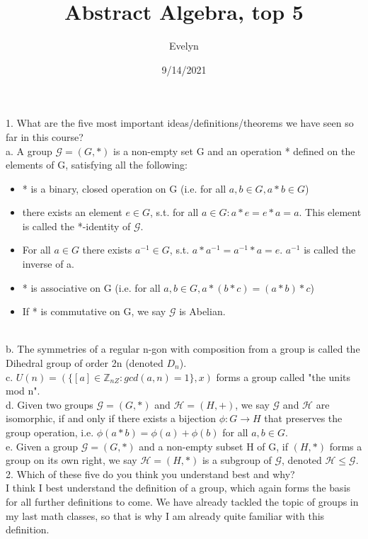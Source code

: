 \documentclass{article}
\title{Abstract Algebra, top 5}
\author{Evelyn}
\date{9/14/2021}
\begin{document}
1. What are the five most important ideas/definitions/theorems we have seen so far in this course?\\

a. A group $\mathcal{G}=(G,*)$ is a non-empty set G and an operation * defined on the elements of G, satisfying all the following:
\begin{itemize}
    \item * is a binary, closed operation on G (i.e. for all $a, b \in G, a*b \in G$)
    \item there exists an element $e \in G$, s.t. for all $a \in G:  a*e=e*a=a$. This element is called the *-identity of $\mathcal{G}$.
    \item For all $a \in G$ there exists $a^{-1} \in G$, s.t.  $a*a^{-1}=a^{-1}*a=e$. $a^{-1}$ is called the inverse of a. 
    \item * is associative on G (i.e. for all $a,b \in G, a*(b*c)=(a*b)*c$)
    \item If * is commutative on G, we say $\mathcal{G}$ is Abelian. 
\end{itemize}\\

b. The symmetries of a regular n-gon with composition from a group is called the Dihedral group of order 2n (denoted $D_n$). \\

c. $U(n)=(\{[a] \in \mathbb{Z}_{n\mathbb{}Z}: gcd(a,n)=1\}, x)$ forms a group called "the units mod n". \\

d. Given two groups $\mathcal{G}=(G,*)$ and $\mathcal{H}=(H,+)$, we say $\mathcal{G}$ and $\mathcal{H}$ are isomorphic, if and only if there exists a bijection $\phi: G \longrightarrow H$ that preserves the group operation, i.e. $\phi(a*b)=\phi(a)+\phi(b)$ for all $a,b \in G$.\\

e. Given a group $\mathcal{G}=(G, *)$ and a non-empty subset H of G, if $(H, *)$ forms a group on its own right, we say $\mathcal{H}=(H, *)$ is a subgroup of $\mathcal{G}$, denoted $\mathcal{H}\leq \mathcal{G}$.\\



2. Which of these five do you think you understand best and why?\\

I think I best understand the definition of a group, which again forms the basis for all further definitions to come. We have already tackled the topic of groups in my last math classes, so that is why I am already quite familiar with this definition. \\
\end{document}
